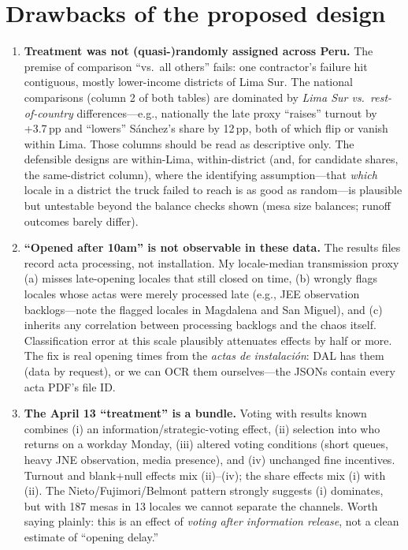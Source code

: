 \documentclass[11pt]{article}
\newcommand{\pp}{\,\text{pp}}
\begin{document}
\section{Drawbacks of the proposed design}\label{sec:drawbacks}

\begin{enumerate}
\item \textbf{Treatment was not (quasi-)randomly assigned across Peru.} The premise of comparison ``vs.\ all others'' fails: one contractor's failure hit contiguous, mostly lower-income districts of Lima Sur. The national comparisons (column 2 of both tables) are dominated by \emph{Lima Sur vs.\ rest-of-country} differences---e.g., nationally the late proxy ``raises'' turnout by +3.7$\pp$ and ``lowers'' S\'anchez's share by 12$\pp$, both of which flip or vanish within Lima. Those columns should be read as descriptive only. The defensible designs are within-Lima, within-district (and, for candidate shares, the same-district column), where the identifying assumption---that \emph{which} locale in a district the truck failed to reach is as good as random---is plausible but untestable beyond the balance checks shown (mesa size balances; runoff outcomes barely differ).
\item \textbf{``Opened after 10am'' is not observable in these data.} The results files record acta processing, not installation. My locale-median transmission proxy (a) misses late-opening locales that still closed on time, (b) wrongly flags locales whose actas were merely processed late (e.g., JEE observation backlogs---note the flagged locales in Magdalena and San Miguel), and (c) inherits any correlation between processing backlogs and the chaos itself. Classification error at this scale plausibly attenuates effects by half or more. The fix is real opening times from the \emph{actas de instalación}: DAL has them (data by request), or we can OCR them ourselves---the JSONs contain every acta PDF's file ID.
\item \textbf{The April 13 ``treatment'' is a bundle.} Voting with results known combines (i) an information/strategic-voting effect, (ii) selection into who returns on a workday Monday, (iii) altered voting conditions (short queues, heavy JNE observation, media presence), and (iv) unchanged fine incentives. Turnout and blank+null effects mix (ii)--(iv); the share effects mix (i) with (ii). The Nieto/Fujimori/Belmont pattern strongly suggests (i) dominates, but with 187 mesas in 13 locales we cannot separate the channels. Worth saying plainly: this is an effect of \emph{voting after information release}, not a clean estimate of ``opening delay.''

\end{enumerate}
\end{document}
